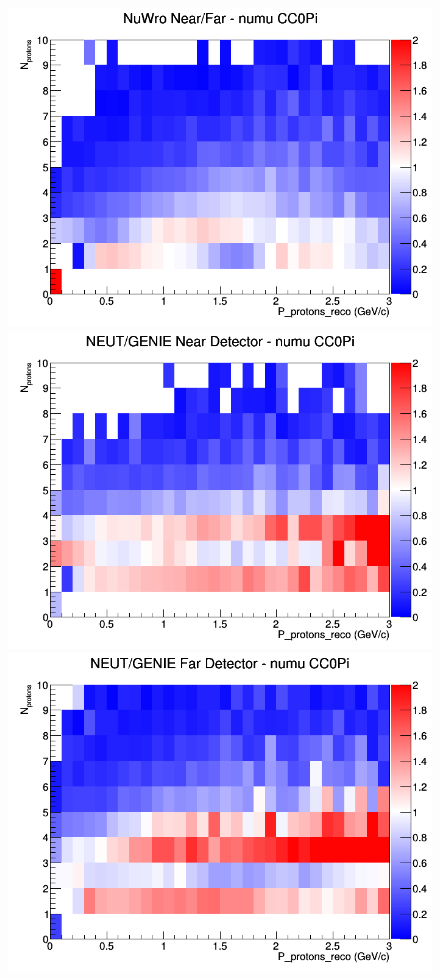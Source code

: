 \begin{figure}[h]
\endminipage
{}
\includegraphics[width=\linewidth]{eff_N_P/FGT/protons/ratios/CC0Pi_NuWro_numu_NF_N_P.png}
\endminipage
\newline
{}
\includegraphics[width=\linewidth]{eff_N_P/FGT/protons/ratios/CC0Pi_NEUT_GENIE_numu_near_N_P.png}
\endminipage
{}
\includegraphics[width=\linewidth]{eff_N_P/FGT/protons/ratios/CC0Pi_NEUT_GENIE_numu_far_N_P.png}

\end{figure}
